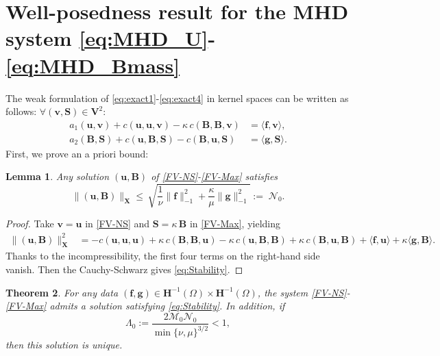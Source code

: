 \documentclass[3p]{elsarticle}
\newtheorem{theorem}{Theorem}
\newtheorem{lemma}[theorem]{Lemma}
\def\V#1{\mathbf{#1}}
\def\VX{\mathbf{X}}
\newcommand{\Mbd}{\mathcal{M}}
\newcommand{\Nbd}{\mathcal{N}}
\begin{document}
\section{Well-posedness result for the MHD system \ref{eq:MHD_U}-\ref{eq:MHD_Bmass}}\label{sec:Existence}
The weak formulation of \eqref{eq:exact1}-\eqref{eq:exact4} in kernel spaces can be written as follows: $\forall (\V{v},\V{S}) \in \V{V}^2$:
\begin{align}
a_1(\V{u},\V{v}) + c(\V{u},\V{u},\V{v})  
- \kappa \, c(\V{B},\V{B},\V{v})   
&= \langle \V{f},\V{v} \rangle, \label{FV-NS} \\
a_2(\V{B}, \V{S}) + c(\V{u},\V{B},\V{S}) - 
c(\V{B},\V{u},\V{S}) &= 
\langle \V{g},\V{S}\rangle. \label{FV-Max}
\end{align}
First, we prove an a priori bound:
\begin{lemma}\label{lem:Stability}
Any solution $(\V{u},\V{B})$ of \eqref{FV-NS}-\eqref{FV-Max} satisfies 
\begin{equation}\label{eq:Stability}
 \|(\V{u},\V{B})\|_\VX \le \,
\sqrt{\frac{1}{\nu}  \|\V{f}\|^2_{-1}
 +  \frac{\kappa}{\mu}  \|\V{g}\|^2_{-1}}:= \; \Nbd_0.
\end{equation}
\end{lemma}
\begin{proof}
Take $\V{v}=\V{u}$ in \eqref{FV-NS} and $\V{S}=\kappa \, \V{B}$ in \eqref{FV-Max}, yielding 
\begin{align*}
 \|(\V{u},\V{B})\|_\VX^2 &= -c(\V{u},\V{u},\V{u})  
+ \kappa \,c(\V{B},\V{B},\V{u}) -
\kappa \,c(\V{u},\V{B},\V{B}) + 
\kappa \,c(\V{B},\V{u},\V{B})
+ \langle \V{f},\V{u} \rangle
+ \kappa \langle \V{g} , \V{B} \rangle.
 \end{align*}
Thanks to the incompressibility, the first four terms on the right-hand side vanish. Then the Cauchy-Schwarz gives \eqref{eq:Stability}.
\end{proof}
\begin{theorem}\label{The-existence}
For any data $(\V{f},\V{g}) \in \V{H}^{-1}(\Omega) \times \V{H}^{-1}(\Omega)$, the system \eqref{FV-NS}-\eqref{FV-Max} admits a solution satisfying \eqref{eq:Stability}. In addition, if 
\begin{equation}\label{Assum-WellPoss}
\Lambda_0:= \frac{2\Mbd_0 \Nbd_0}{\min\{\nu,\mu\}^{3/2}} < 1,
\end{equation}
then this solution is unique.
\end{theorem}
\end{document}
